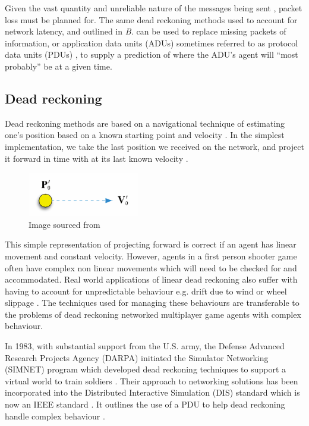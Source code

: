 \documentclass[journal]{IEEEtran}
\begin{document}
Given the vast quantity and unreliable nature of the messages being sent \cite{cronin2001distributed}, packet loss must be planned for. The same dead reckoning methods used to account for network latency, and outlined in \textit{B.} can be used to replace missing packets of information, or application data units (ADUs) \cite{diot1999distributed} sometimes referred to as protocol data units (PDUs) \cite{dis1998ieee}, to supply a prediction of where the ADU's agent will ``most probably'' be at a given time.

\subsection{Dead reckoning}

Dead reckoning methods are based on a navigational technique of estimating one’s position based on a known starting point and velocity \cite{smed2002aspects}. In the simplest implementation, we take the last position we received on the network, and project it forward in time with at its last known velocity \cite{murphy2011believable}.

\begin{figure}[h]
    \centering
    \includegraphics[width=0.5\linewidth]{DR1.png}
    \caption{Image sourced from \cite{murphy2011believable}}
    \label{fig:dr1}
\end{figure}

This simple representation of projecting forward is correct if an agent has linear movement and constant velocity. However, agents in a first person shooter game often have complex non linear movements which will need to be checked for and accommodated. Real world applications of linear dead reckoning also suffer with having to account for unpredictable behaviour e.g. drift due to wind or wheel slippage \cite{chung2001accurate} \cite{ojeda2004experimental}. The techniques used for managing these behaviours are transferable to the problems of dead reckoning networked multiplayer game agents with complex behaviour.

In 1983, with substantial support from the U.S. army, the Defense Advanced Research Projects Agency (DARPA) initiated the Simulator Networking (SIMNET) program which developed dead reckoning techniques to support a virtual world to train soldiers \cite{calvin1993simnet}. Their approach to networking solutions has been incorporated into the Distributed Interactive Simulation (DIS) standard which is now an IEEE standard \cite{dis1998ieee}. It outlines the use of a PDU to help dead reckoning handle complex behaviour \cite{mccarty1994virtual}.
 
\end{document}
